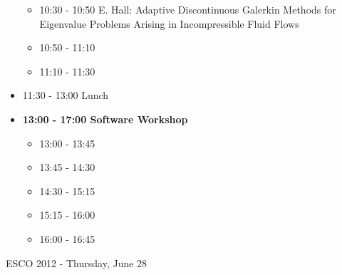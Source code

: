 \documentclass[10pt, A4]{article}%
\begin{document}
\begin{itemize}
\begin{itemize}
    \item 10:30 - 10:50 E. Hall: Adaptive Discontinuous Galerkin Methods for Eigenvalue Problems Arising in Incompressible Fluid Flows
    \item 10:50 - 11:10 
    \item 11:10 - 11:30
  \end{itemize}
  \item 11:30 - 13:00 Lunch
  \item {\bf 13:00 - 17:00 Software Workshop}
  \begin{itemize}
    \item 13:00 - 13:45 
    \item 13:45 - 14:30 
    \item 14:30 - 15:15 
    \item 15:15 - 16:00 
    \item 16:00 - 16:45 
  \end{itemize}
\end{itemize}

\newpage

\centerline{\huge ESCO 2012 - Thursday, June 28}
\vspace{4mm}
\end{document}
